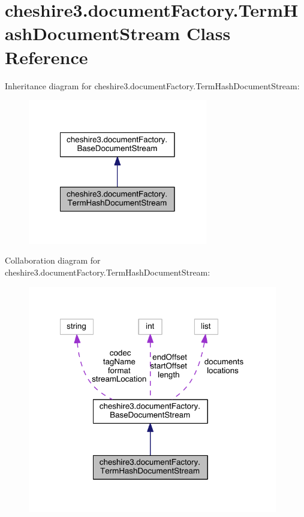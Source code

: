 \hypertarget{classcheshire3_1_1document_factory_1_1_term_hash_document_stream}{\section{cheshire3.\-document\-Factory.\-Term\-Hash\-Document\-Stream Class Reference}
\label{classcheshire3_1_1document_factory_1_1_term_hash_document_stream}
}


Inheritance diagram for cheshire3.\-document\-Factory.\-Term\-Hash\-Document\-Stream\-:
\nopagebreak
\begin{figure}[H]
\begin{center}
\leavevmode
\includegraphics[width=222pt]{classcheshire3_1_1document_factory_1_1_term_hash_document_stream__inherit__graph}
\end{center}
\end{figure}


Collaboration diagram for cheshire3.\-document\-Factory.\-Term\-Hash\-Document\-Stream\-:
\nopagebreak
\begin{figure}[H]
\begin{center}
\leavevmode
\includegraphics[width=309pt]{classcheshire3_1_1document_factory_1_1_term_hash_document_stream__coll__graph}
\end{center}
\end{figure}
